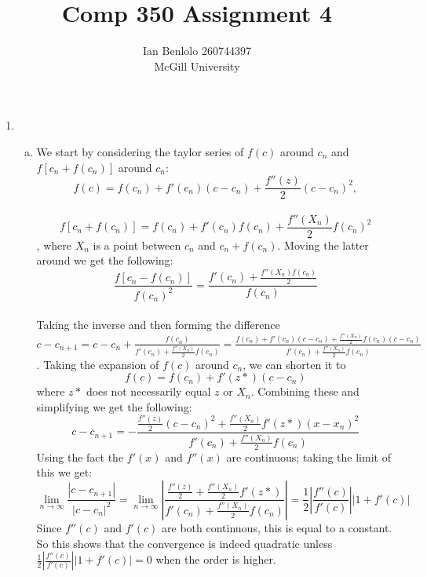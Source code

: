 
\usepackage{cancel}
\usepackage{enumerate}
\usepackage{appendix}
\usepackage{pdfpages}
\usepackage{enumerate}
\title{Comp 350 Assignment 4}
\author{Ian Benlolo 260744397\\McGill University \\}

\maketitle

\begin{enumerate}[1.]
\item
	\begin{enumerate}[(a)]
	\item We start by considering the taylor series of $f(c)$ around $c_n$ and $f[c_n+f(c_n)]$ around $c_n$:
	$$f(c)=f(c_n)+f'(c_n)(c-c_n)+\frac{f''(z)}{2}{(c-c_n)}^2 ,$$\\
	$$f[c_n+f(c_n)]=f(c_n)+f'(c_n)f(c_n)+\frac{f''(X_n)}{2}{f(c_n)}^2$$, 
	where $X_n$ is a point between $c_n$ and $c_n+f(c_n)$. Moving the latter around we get the following:
	$$\frac{f[c_n-f(c_n)]}{{f(c_n)}^2}=\frac{f'(c_n)+\frac{f''(X_n)f(c_n)}{2}}{f(c_n)}$$\\
	Taking the inverse and then forming the difference $c-c_{n+1}=c-c_n+\frac{f(c_n)}{f'(c_n)+\frac{f''(X_n)}{2}f(c_n)} = \frac{f(c_n)+f'(c_n)(c-c_n)+\frac{f''(X_n)}{2}f(c_n)(c-c_n)}{f'(c_n)+\frac{f''(X_n)}{2}f(c_n)}$.
	Taking the expansion of $f(c)$ around $c_n$, we can shorten it to $$f(c)=f(c_n)+f'(z*)(c-c_n)$$ where $z*$ does not necessarily equal $z$ or $X_n$. 
	Combining these and simplifying we get the following:$$c-c_{n+1}=-\frac{\frac{f''(z)}{2}{(c-c_n)}^2+\frac{f''(X_n)}{2}f'(z*){(x-x_n)^2}}{f'(c_n)+\frac{f''(X_n)}{2}f(c_n)}$$
	Using the fact the $f'(x)$ and $f''(x)$ are continuous; taking the limit of this we get:$$\lim_{n \to \infty}\frac{|c-c_{n+1}|}{|c-c_n|^2}=\lim_{n \to \infty}\left|{\frac{\frac{f''(z)}{2}+\frac{f''(X_n)}{2}f'(z*)}{f'(c_n)+\frac{f''(X_n)}{2}f(c_n)}}\right|=\frac{1}{2}\left|\frac{f''(c)}{f'(c)}\right||1+f'(c)|$$
	Since $f''(c)$ and $f'(c)$ are both continuous, this is equal to a constant. So this shows that the convergence is indeed quadratic unless $\frac{1}{2}\left|\frac{f''(c)}{f'(c)}\right||1+f'(c)|=0$ when the order is higher.
	

\end{enumerate}
\end{enumerate}
